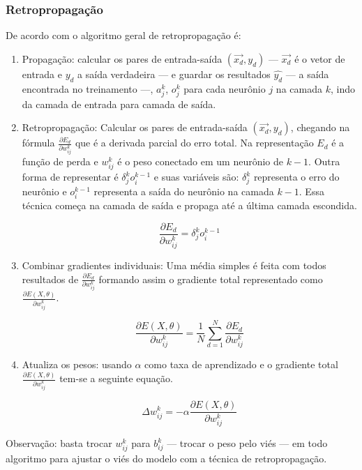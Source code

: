 \subsubsection*{Retropropagação}

De acordo com  o algoritmo geral de retropropagação é:

\begin{enumerate}
    \item Propagação: calcular os pares de entrada-saída $(\overrightarrow{x_d}, y_d)$ — $\overrightarrow{x_d}$ é o vetor de entrada e $y_d$ a saída verdadeira — e guardar os resultados $\hat{y_d}$ — a saída encontrada no treinamento —, $a_j^k$, $o_j^k$ para cada neurônio $j$ na camada $k$, indo da camada de entrada para camada de saída.

    \item Retropropagação: Calcular os pares de entrada-saída $(\overrightarrow{x_d}, y_d)$, chegando na fórmula $\frac{\partial{E_d}}{\partial{w_{ij}^k}}$ que é a derivada parcial do erro total. Na representação $E_d$ é a função de perda e $w_{ij}^k$ é o peso  conectado em um neurônio de $k - 1$. Outra forma de representar é $\delta_j^k o_i^{k - 1}$ e suas variáveis são: $\delta_j^k$ representa o erro do neurônio e $o_i^{k - 1}$ representa a saída do neurônio na camada $k -1$. Essa técnica começa na camada de saída e propaga até a última camada escondida.

    \begin{equation}
        \frac{\partial{E_d}}{\partial{w_{ij}^k}} = \delta_j^k o_i^{k - 1}
    \end{equation}

    \item Combinar gradientes individuais: Uma média simples é feita com todos resultados de $\frac{\partial{E_d}}{\partial{w_{ij}^k}}$ formando assim o gradiente total representado como $\frac{\partial{E(X, \theta)}}{\partial{w_{ij}^k}}$.

    \begin{equation}
        \frac{\partial{E(X,\theta)}}{\partial{w_{ij}^k}} = \frac{1}{N} \sum_{d=1}^{N} \frac{\partial{E_d}}{\partial{w_{ij}^k}}
    \end{equation}

    \item Atualiza os pesos: usando $\alpha$ como taxa de aprendizado e o gradiente total $\frac{\partial{E(X, \theta)}}{\partial{w_{ij}^k}}$ tem-se a seguinte equação.

    \begin{equation}
        \Delta w_{ij}^k = -\alpha \frac{\partial{E(X,\theta)}}{\partial{w_{ij}^k}}
    \end{equation}
\end{enumerate}

Observação: basta trocar $w_{ij}^k$ para $b_{ij}^k$ — trocar o peso pelo viés — em todo algoritmo para ajustar o viés do modelo com a técnica de retropropagação.

